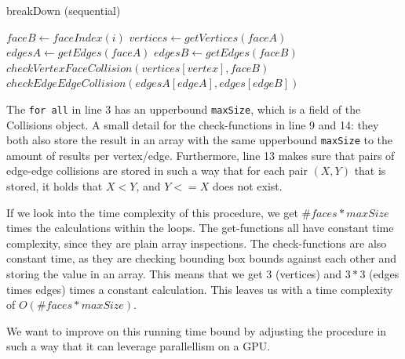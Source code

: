 \begin{algorithm}
\caption{breakDown (sequential)}\label{breakseq}
\begin{algorithmic}[1]
            \State $faceB \gets faceIndex(i)$ 
            \State $vertices \gets getVertices(faceA)$
            \State $edgesA \gets getEdges(faceA)$
            \State $edgesB \gets getEdges(faceB)$
                \State $checkVertexFaceCollision(vertices[vertex], faceB)$
            \EndFor
                     
                        \State $checkEdgeEdgeCollision(edgesA[edgeA], edges[edgeB])$
                    \EndIf
                \EndFor
            \EndFor
        \EndFor
    \EndFor
\EndProcedure
\end{algorithmic}
\end{algorithm}

The \texttt{for all} in line 3 has an upperbound \texttt{maxSize}, which is a field of the Collisions object. A small detail for the check-functions in line 9 and 14: they both also store the result in an array with the same upperbound \texttt{maxSize} to the amount of results per vertex/edge. Furthermore, line 13 makes sure that pairs of edge-edge collisions are stored in such a way that for each pair $(X,Y)$ that is stored, it holds that $X < Y$, and $Y <= X$ does not exist.

If we look into the time complexity of this procedure, we get $\#faces *  maxSize$ times the calculations within the loops. The get-functions all have constant time complexity, since they are plain array inspections. The check-functions are also constant time, as they are checking bounding box bounds against each other and storing the value in an array. This means that we get $3$ (vertices) and $3*3$ (edges times edges) times a constant calculation. This leaves us with a time complexity of $O(\#faces *  maxSize)$.

We want to improve on this running time bound by adjusting the procedure in such a way that it can leverage parallellism on a GPU.
